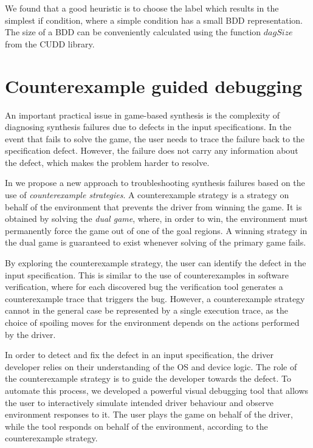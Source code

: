 We found that a good heuristic is to choose the label which results in the simplest if condition, where a simple condition has a small BDD representation. The size of a BDD can be conveniently calculated using the function $dagSize$ from the CUDD library. 

\section{Counterexample guided debugging}
\label{s:debug}

An important practical issue in game-based synthesis is the complexity of diagnosing synthesis failures due to defects in the input specifications.  In the event that \termite fails to solve the game, the user needs to trace the failure back to the specification defect.  However, the failure does not carry any information about the defect, which makes the problem harder to resolve.

In \termite we propose a new approach to troubleshooting synthesis failures based on the use of \emph{counterexample strategies}.  A counterexample strategy is a strategy on behalf of the environment that prevents the driver from winning the game.  It is obtained by solving the \emph{dual game}, where, in order to win, the environment must permanently force the game out of one of the goal regions.  A winning strategy in the dual game is guaranteed to exist whenever solving of the primary game fails.

By exploring the counterexample strategy, the user can identify the defect in the input specification.  This is similar to the use of counterexamples in software verification, where for each discovered bug the verification tool generates a counterexample trace that triggers the bug.  However, a counterexample strategy cannot in the general case be represented by a single execution trace, as the choice of spoiling moves for the environment depends on the actions performed by the driver.

In order to detect and fix the defect in an input specification, the driver developer relies on their  understanding of the OS and device logic.  The role of the counterexample strategy is to guide the developer towards the defect.  To automate this process, we developed a powerful visual debugging tool that allows the user to interactively simulate intended driver behaviour and observe environment responses to it.  The user plays the game on behalf of the driver, while the tool responds on behalf of the environment, according to the counterexample strategy.
 

